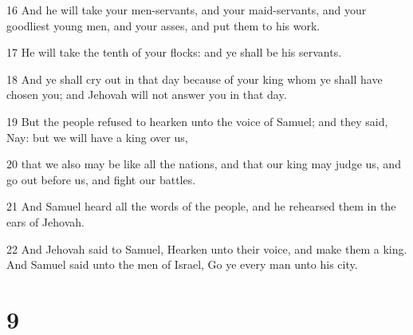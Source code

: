 \par 16 And he will take your men-servants, and your maid-servants, and your goodliest young men, and your asses, and put them to his work.
\par 17 He will take the tenth of your flocks: and ye shall be his servants.
\par 18 And ye shall cry out in that day because of your king whom ye shall have chosen you; and Jehovah will not answer you in that day.
\par 19 But the people refused to hearken unto the voice of Samuel; and they said, Nay: but we will have a king over us,
\par 20 that we also may be like all the nations, and that our king may judge us, and go out before us, and fight our battles.
\par 21 And Samuel heard all the words of the people, and he rehearsed them in the ears of Jehovah.
\par 22 And Jehovah said to Samuel, Hearken unto their voice, and make them a king. And Samuel said unto the men of Israel, Go ye every man unto his city.

\chapter{9}

